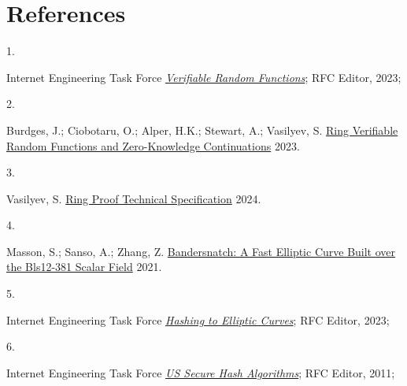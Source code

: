 \documentclass[
]{article}
\newlength{\cslhangindent}
\newlength{\csllabelwidth}
\newlength{\cslentryspacingunit} %
\newenvironment{CSLReferences}[2] %
 {%
  \setlength{\parindent}{0pt}
  \ifodd #1
  \let\oldpar\par
  \def\par{\hangindent=\cslhangindent\oldpar}
  \fi
  \setlength{\parskip}{#2\cslentryspacingunit}
 }%
 {}
\newcommand{\CSLLeftMargin}[1]{\parbox[t]{\csllabelwidth}{#1}}
\newcommand{\CSLRightInline}[1]{\parbox[t]{\linewidth - \csllabelwidth}{#1}\break}
\begin{document}
\hypertarget{references}{%
\section*{References}\label{references}}

\hypertarget{refs}{}
\begin{CSLReferences}{0}{0}
\leavevmode{}%
\CSLLeftMargin{1. }
\CSLRightInline{Internet Engineering Task Force
\emph{\href{https://datatracker.ietf.org/doc/rfc9381}{{Verifiable Random
Functions}}}; {RFC Editor}, 2023;}

\leavevmode{}%
\CSLLeftMargin{2. }
\CSLRightInline{Burdges, J.; Ciobotaru, O.; Alper, H.K.; Stewart, A.;
Vasilyev, S. \href{https://eprint.iacr.org/2023/002}{Ring Verifiable
Random Functions and Zero-Knowledge Continuations} 2023.}

\leavevmode{}%
\CSLLeftMargin{3. }
\CSLRightInline{Vasilyev, S.
\href{https://hackmd.io/ulW5nFFpTwClHsD0kusJAA}{Ring Proof Technical
Specification} 2024.}

\leavevmode{}%
\CSLLeftMargin{4. }
\CSLRightInline{Masson, S.; Sanso, A.; Zhang, Z.
\href{https://eprint.iacr.org/2021/1152}{Bandersnatch: A Fast Elliptic
Curve Built over the Bls12-381 Scalar Field} 2021.}

\leavevmode{}%
\CSLLeftMargin{5. }
\CSLRightInline{Internet Engineering Task Force
\emph{\href{https://datatracker.ietf.org/doc/rfc9380}{{Hashing to
Elliptic Curves}}}; {RFC Editor}, 2023;}

\leavevmode{}%
\CSLLeftMargin{6. }
\CSLRightInline{Internet Engineering Task Force
\emph{\href{https://datatracker.ietf.org/doc/rfc6234}{{US Secure Hash
Algorithms}}}; {RFC Editor}, 2011;}

\end{CSLReferences}
\end{document}
